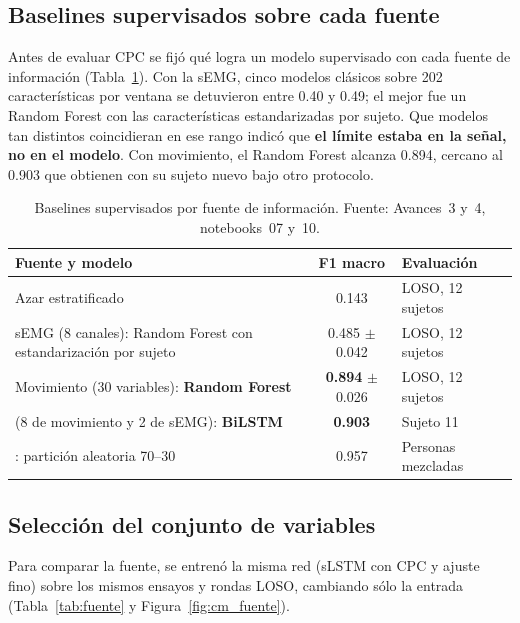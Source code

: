 \documentclass[letterpaper,11pt]{article}
\begin{document}
\subsection{Baselines supervisados sobre cada fuente}
\label{sec:semg}
Antes de evaluar CPC se fijó qué logra un modelo supervisado con cada fuente de información (Tabla~\ref{tab:baseline}). Con la sEMG, cinco modelos clásicos sobre 202 características por ventana se detuvieron entre 0.40 y 0.49; el mejor fue un Random Forest \parencite{breiman2001} con las características estandarizadas por sujeto. Que modelos tan distintos coincidieran en ese rango indicó que \textbf{el límite estaba en la señal, no en el modelo}. Con movimiento, el Random Forest alcanza 0.894, cercano al 0.903 que \textcite{bassani2025} obtienen con su sujeto nuevo bajo otro protocolo.

\begin{table}[H]
  \centering
  \small
  \caption{Baselines supervisados por fuente de información. Fuente: Avances~3 y~4, notebooks~07 y~10.}
  \label{tab:baseline}
  \begin{tabular}{p{9.0cm}c>{\raggedright\arraybackslash}p{3.4cm}}
    \toprule
    Fuente y modelo & F1 macro & Evaluación \\
    \midrule
    Azar estratificado & 0.143 & LOSO, 12 sujetos \\
    sEMG (8 canales): Random Forest con estandarización por sujeto & 0.485 $\pm$ 0.042 & LOSO, 12 sujetos \\
    Movimiento (30 variables): \textbf{Random Forest} & \textbf{0.894} $\pm$ 0.026 & LOSO, 12 sujetos \\
    \textcite{bassani2025} (8 de movimiento y 2 de sEMG): \textbf{BiLSTM} & \textbf{0.903} & Sujeto 11 \\
    \textcite{bassani2025}: partición aleatoria 70--30 & 0.957 & Personas mezcladas \\
    \bottomrule
  \end{tabular}
\end{table}

\subsection{Selección del conjunto de variables}
\label{sec:fuente}
Para comparar la fuente, se entrenó la misma red (sLSTM con CPC y ajuste fino) sobre los mismos ensayos y rondas LOSO, cambiando sólo la entrada (Tabla~\ref{tab:fuente} y Figura~\ref{fig:cm_fuente}).
\end{document}
